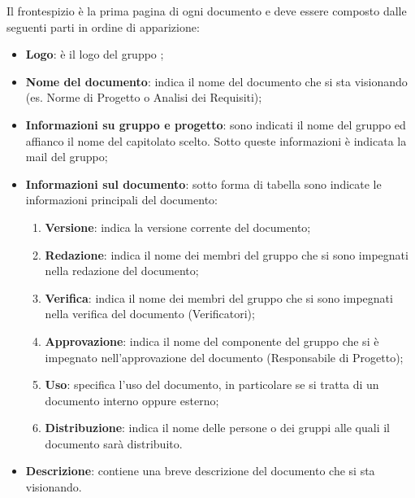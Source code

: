 
				Il frontespizio è la prima pagina di ogni documento e deve essere composto dalle seguenti parti
				in ordine di apparizione:

                    \begin{itemize}
                        \item \textbf{Logo}: è il logo del gruppo \GroupName;
                        \item \textbf{Nome del documento}: indica il nome del documento che si sta
                        visionando (es. Norme di Progetto o Analisi dei Requisiti);
                        \item \textbf{Informazioni su gruppo e progetto}: sono indicati il nome del gruppo
                        ed affianco il nome del capitolato scelto. Sotto queste informazioni è indicata
                        la mail del gruppo;
                        \item \textbf{Informazioni sul documento}: sotto forma di tabella sono indicate
                        le informazioni principali del documento:

                        \begin{enumerate}
                            \item \textbf{Versione}: indica la versione corrente del documento;
                            \item \textbf{Redazione}: indica il nome dei membri del gruppo che si
                            sono impegnati nella redazione del documento;
                            \item \textbf{Verifica}: indica il nome dei membri del gruppo che si sono
                            impegnati nella verifica del documento (Verificatori);
                            \item \textbf{Approvazione}: indica il nome del componente del gruppo che si
                            è impegnato nell'approvazione del documento (Responsabile di Progetto);
                            \item \textbf{Uso}: specifica l'uso del documento, in particolare se si tratta
                            di un documento interno oppure esterno;
                            \item \textbf{Distribuzione}: indica il nome delle persone o dei gruppi alle
                            quali il documento sarà distribuito.
                        \end{enumerate}

                        \item \textbf{Descrizione}: contiene una breve descrizione del documento che si sta visionando.
                    \end{itemize}


